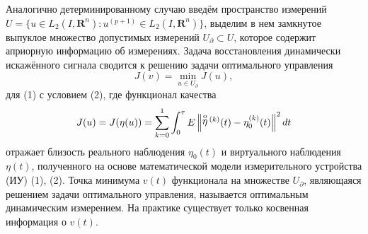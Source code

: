 

Аналогично детерминированному случаю введём прост\-ранст\-во измерений $U \!=\! \{ u \in L_{2} (I,{\mathbf R}^{n}) : u^{(p+1)} \in L_{2} (I,{\mathbf R}^{n} )\} $, выделим в нем замкнутое выпуклое множество допустимых измерений $U_{\partial}\subset U$, которое содержит априорную информацию об измерениях. Задача восстановления динамически искажённого сигнала сводится к решению задачи оптимального управления
 $$
 J(v)=\mathop{\min }\limits_{u\in U_{\partial } } J(u),
 $$
для (1) с условием (2), где функционал качества
   $$ J(u)=J(\eta (u))=\sum _{k=0}^{1}\int _{0}^{\tau }E\left\| \mathop{\eta }\limits^{{\rm o}}{}^{(k)} (t)-\eta _{0}^{(k)} (t)\right\|   ^{2} dt
   $$
отражает близость реального наблюдения $\eta_{0} (t)$ и виртуального наблюдения $\eta (t)$, полученного на основе математической модели измерительного устройства (ИУ) (1), (2).
	 Точка минимума $v(t)$ функционала на множестве $U_{\partial } $, являющаяся решением задачи оптимального управления, называется оптимальным динамическим измерением. На практике существует только косвенная информация о $v(t)$.
	
